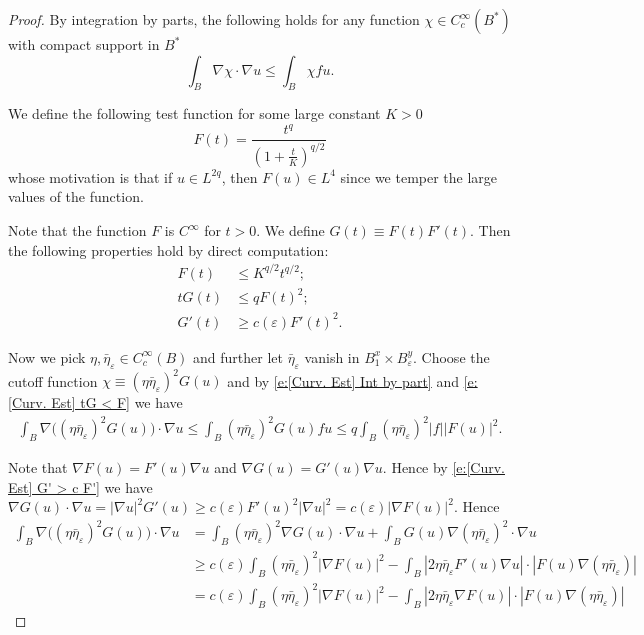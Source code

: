 \documentclass[11pt,reqno]{amsart}
\numberwithin{equation}{section}
\theoremstyle{definition}
\theoremstyle{remark}
\begin{document}
\begin{proof}
    By integration by parts, the following holds for any function $\chi \in C_c^{\infty}(B^*)$ with compact support in $B^*$
    \begin{equation}\label{e:[Curv. Est] Int by part}
        \int_B \nabla \chi \cdot \nabla u \leqslant \int_B \chi f u.
    \end{equation}

We define the following test function for some large constant $K>0$
\begin{equation}
    F(t) = \frac{t^{q}}{(1 + \frac{t}{K})^{q/2}}
\end{equation}
whose motivation is that if $u\in L^{2q}$, then $F(u)\in L^4$ since we temper the large values of the function.

Note that the function $F$ is $C^{\infty}$ for $t>0$. We define $G(t) \equiv F(t) F'(t)$. Then the following properties hold by direct computation:
\begin{align}
    F(t) &\leqslant  K^{q/2} t^{q/2};\\
    tG(t) &\leqslant qF(t)^2;\label{e:[Curv. Est] tG < F}\\
    G'(t) &\geqslant c(\varepsilon) F'(t)^2. \label{e:[Curv. Est] G' > c F'}
\end{align}


Now we pick $\eta, \bar{\eta}_{\varepsilon} \in C_c^{\infty}(B)$ and further let $\bar{\eta}_{\varepsilon}$ vanish in $B_1^x \times B_{\varepsilon}^y$. Choose the cutoff function $\chi \equiv (\eta \bar{\eta}_{\varepsilon})^2 G(u)$ and by \eqref{e:[Curv. Est] Int by part} and \eqref{e:[Curv. Est] tG < F} we have
\begin{align}\label{eq:control nablaG nablau}
    \int_{B} \nabla \Big( (\eta \bar{\eta}_{\varepsilon})^2 G(u)\Big) \cdot \nabla u \leqslant \int_{B} (\eta \bar{\eta}_{\varepsilon})^2 G(u) f u \leqslant q \int_{B} (\eta \bar{\eta}_{\varepsilon})^2  |f| |F(u)|^2.
\end{align}

Note that $\nabla F(u) = F'(u) \nabla u$ and $\nabla G(u)= G'(u) \nabla u$. Hence by \eqref{e:[Curv. Est] G' > c F'} we have $\nabla G(u) \cdot \nabla u = |\nabla u|^2 G'(u) \geqslant c(\varepsilon) F'(u)^2 |\nabla u|^2 = c(\varepsilon)|\nabla F(u)|^2$. Hence
\begin{align}
    \int_{B} \nabla \Big( (\eta \bar{\eta}_{\varepsilon})^2 G(u)\Big) \cdot \nabla u &= \int_B (\eta \bar{\eta}_{\varepsilon})^2 \nabla G(u) \cdot \nabla u + \int_B G(u) \nabla (\eta \bar{\eta}_{\varepsilon})^2 \cdot \nabla u \\
    &\geqslant c(\varepsilon) \int_B (\eta \bar{\eta}_{\varepsilon})^2 |\nabla F(u)|^2- \int_B    |2 \eta \bar{\eta}_{\varepsilon} F'(u) \nabla u| \cdot  |  F(u) \nabla(\eta \bar{\eta}_{\varepsilon}) |   \\
    &= c(\varepsilon) \int_B (\eta \bar{\eta}_{\varepsilon})^2 |\nabla F(u)|^2- \int_B    |2 \eta \bar{\eta}_{\varepsilon} \nabla F(u)| \cdot  |  F(u) \nabla(\eta \bar{\eta}_{\varepsilon}) |
\end{align}



\end{proof}
\end{document}
